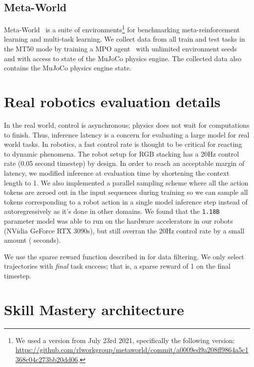 \documentclass[10pt]{article} \usepackage[accepted]{tmlr}
\begin{document}
\subsection{Meta-World}
\vskip 0.2cm
Meta-World~\citep{yu2020meta} is a suite of environments\footnote{We used a version from July 23rd 2021, specifically the following version: \url{https://github.com/rlworkgroup/metaworld/commit/a0009ed9a208ff9864a5c1368c04c273bb20dd06}.} for benchmarking meta-reinforcement learning and multi-task learning.
We collect data from all train and test tasks in the MT50 mode by training a MPO agent~\citep{abdolmaleki2018maximum} with
unlimited environment seeds and with access to state of the MuJoCo physics engine. The collected data also contains the MuJoCo physics engine state.

\section{Real robotics evaluation details}

In the real world, control is asynchronous; physics does not wait for computations to finish. Thus, inference latency is a concern for evaluating a large model for real world tasks. In robotics, a fast control rate is thought to be critical for reacting to dynamic phenomena. The robot setup for RGB stacking has a 20Hz control rate (0.05 second timestep) by design. In order to reach an acceptable margin of latency, we modified inference at evaluation time by shortening the context length to 1. We also implemented a parallel sampling scheme where all the action tokens are zeroed out in the input sequences during training so we can sample all tokens corresponding to a robot action in a single model inference step instead of autoregressively as it's done in other domains. We found that the \texttt{1.18B} parameter model was able to run on the hardware accelerators in our robots (NVidia GeForce RTX 3090s), but still overran the 20Hz control rate by a small amount ( seconds). 

We use the sparse reward function described in \cite{lee2021beyond} for data filtering. We only select trajectories with \emph{final} task success; that is, a sparse reward of 1 on the final timestep.

\section{Skill Mastery architecture}
\label{sec:skill_mastery_architecture}
\end{document}
